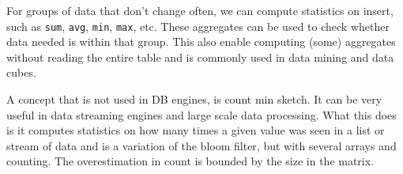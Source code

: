 For groups of data that don't change often, we can compute statistics on insert, such as \texttt{sum}, \texttt{avg}, \texttt{min}, \texttt{max}, etc.
These aggregates can be used to check whether data needed is within that group.
This also enable computing (some) aggregates without reading the entire table and is commonly used in data mining and data cubes.

A concept that is not used in DB engines, is count min sketch. It can be very useful in data streaming engines and large scale data processing.
What this does is it computes statistics on how many times a given value was seen in a list or stream of data and is a variation of the bloom filter,
but with several arrays and counting. The overestimation in count is bounded by the size in the matrix.
